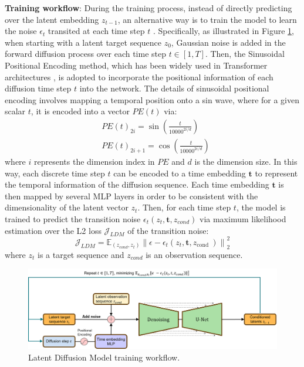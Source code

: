 \documentclass[final-report]{article-template}
\begin{document}
\textbf{Training workflow}: During the training process, instead of directly predicting over the latent embedding $z_{t-1}$, an alternative way is to train the model to learn the noise $\epsilon_t$ transited at each time step $t$ \cite{rombach2022highresolution, gao2024prediff}. Specifically, as illustrated in Figure \ref{fig:ldm_training}, when starting with a latent target sequence $z_0$, Gaussian noise is added in the forward diffusion process over each time step $t \in [1, T]$. Then, the Sinusoidal Positional Encoding method, which has been widely used in Transformer architectures \cite{vaswani2017attention}, is adopted to incorporate the positional information of each diffusion time step $t$ into the network. The details of sinusoidal positional encoding involves mapping a temporal position onto a sin wave, where for a given scalar $t$, it is encoded into a vector $PE(t)$ via:
\begin{align}
    &PE(t)_{2i} = \sin (\frac{t}{10000^{2i/d}}) \nonumber\\
    &PE(t)_{2i+1} = \cos (\frac{t}{10000^{2i/d}})
\end{align}
where $i$ represents the dimension index in $PE$ and $d$ is the dimension size. In this way, each discrete time step $t$ can be encoded to a time embedding $\mathbf{t}$ to represent the temporal information of the diffusion sequence. Each time embedding $\mathbf{t}$ is then mapped by several MLP layers in order to be consistent with the dimensionality of the latent vector $z_t$. Then, for each time step $t$, the model is trained to predict the transition noise $\epsilon_t(z_t, \mathbf{t}, z_{cond})$ via maximum likelihood estimation over the L2 loss $\mathcal{J}_{LDM}$ of the transition noise:
\begin{equation}
    \mathcal{J}_{LDM}=\mathbb{E}_{(z_{cond}, z_t)}\left\|\epsilon-\epsilon_t\left(z_t, \mathbf{t}, z_{\text {cond }}\right)\right\|^2_2
\end{equation}
where $z_t$ is a target sequence and $z_{cond}$ is an observation sequence. \\

\begin{figure}[htbp]
    \centering
    \includegraphics[width=16cm]{figures/ldm_training.png}
    \caption{Latent Diffusion Model training workflow.}
    \label{fig:ldm_training}
\end{figure}
\end{document}
